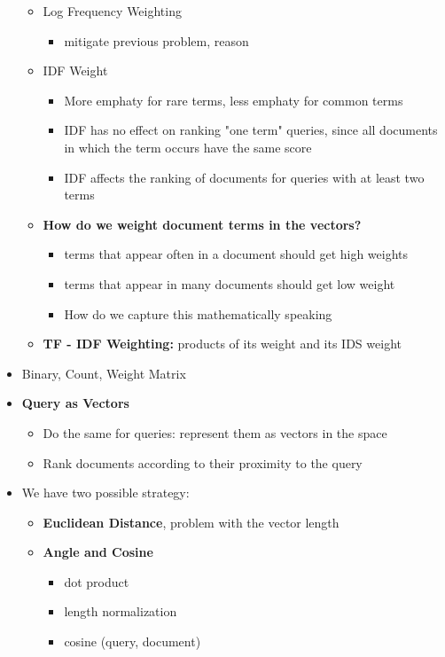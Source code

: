 \begin{itemize}
\begin{itemize}
\begin{itemize}
        \end{itemize}
        \item Log Frequency Weighting
        \begin{itemize}
            \item mitigate previous problem, reason
        \end{itemize}
        \item IDF Weight 
        \begin{itemize}
            \item More emphaty for rare terms, less emphaty for common terms
            \item IDF has no effect on ranking "one term" queries, since all documents in which the term occurs have the same score
            \item IDF affects the ranking of documents for queries with at least two terms
        \end{itemize}
        \item \textbf{How do we weight document terms in the vectors?}
        \begin{itemize}
            \item terms that appear often in a document should get high weights
            \item terms that appear in many documents should get low weight
            \item How do we capture this mathematically speaking
        \end{itemize}
        \item \textbf{TF - IDF Weighting:} products of its weight and its IDS weight
    \end{itemize}
    \item Binary, Count, Weight Matrix
    \item \textbf{Query as Vectors}
    \begin{itemize}
        \item Do the same for queries: represent them as vectors in the space
        \item Rank documents according to their proximity to the query
    \end{itemize}
    \item We have two possible strategy:
    \begin{itemize}
        \item \textbf{Euclidean Distance}, problem with the vector length
        \item \textbf{Angle and Cosine}
        \begin{itemize}
            \item dot product
            \item length normalization
            \item cosine (query, document)
        \end{itemize}
    \end{itemize}
\end{itemize}


